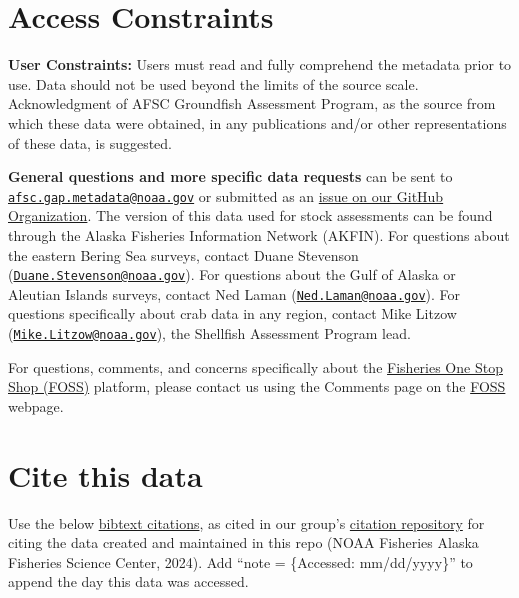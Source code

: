 \documentclass[
  letterpaper,
  oneside,
  open=any]{scrbook}
\begin{document}
\hypertarget{access-constraints-1}{%
\section*{Access Constraints}\label{access-constraints-1}}


\textbf{User Constraints:} Users must read and fully comprehend the
metadata prior to use. Data should not be used beyond the limits of the
source scale. Acknowledgment of AFSC Groundfish Assessment Program, as
the source from which these data were obtained, in any publications
and/or other representations of these data, is suggested.

\textbf{General questions and more specific data requests} can be sent
to
\href{mailto:afsc.gap.metadata@noaa.gov}{\nolinkurl{afsc.gap.metadata@noaa.gov}}
or submitted as an
\href{https://github.com/afsc-gap-products/data-requests}{issue on our
GitHub Organization}. The version of this data used for stock
assessments can be found through the Alaska Fisheries Information
Network (AKFIN). For questions about the eastern Bering Sea surveys,
contact Duane Stevenson
(\href{mailto:Duane.Stevenson@noaa.gov}{\nolinkurl{Duane.Stevenson@noaa.gov}}).
For questions about the Gulf of Alaska or Aleutian Islands surveys,
contact Ned Laman
(\href{mailto:Ned.Laman@noaa.gov}{\nolinkurl{Ned.Laman@noaa.gov}}). For
questions specifically about crab data in any region, contact Mike
Litzow
(\href{mailto:Mike.Litzow@noaa.gov}{\nolinkurl{Mike.Litzow@noaa.gov}}),
the Shellfish Assessment Program lead.

For questions, comments, and concerns specifically about the
\href{https://www.fisheries.noaa.gov/foss}{Fisheries One Stop Shop
(FOSS)} platform, please contact us using the Comments page on the
\href{https://www.fisheries.noaa.gov/foss}{FOSS} webpage.

\hypertarget{cite-this-data-3}{%
\section*{Cite this data}\label{cite-this-data-3}}


Use the below
\href{https://github.com/afsc-gap-products/gap_products/blob/main/code/CITATION_FOSSAFSCData.bib}{bibtext
citations}, as cited in our group's
\href{https://github.com/afsc-gap-products/citations/blob/main/cite/bibliography.bib}{citation
repository} for citing the data created and maintained in this repo
(NOAA Fisheries Alaska Fisheries Science Center, 2024). Add ``note =
\{Accessed: mm/dd/yyyy\}'' to append the day this data was accessed.
\end{document}
